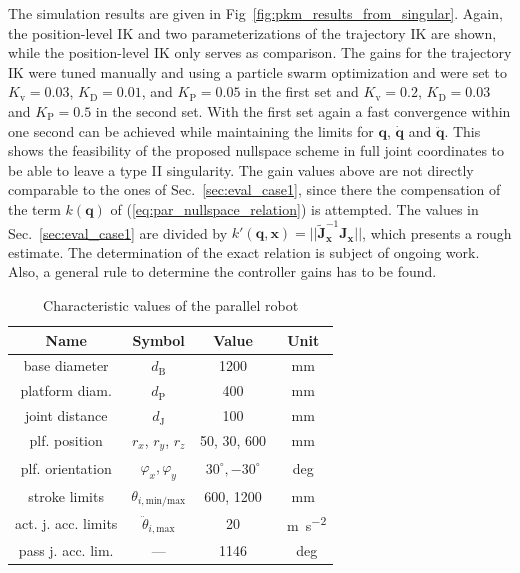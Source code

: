 \documentclass[a4paper,twoside]{article}
\begin{document}
The simulation results are given in Fig~\ref{fig:pkm_results_from_singular}.
Again, the position-level IK and two parameterizations of the trajectory IK are shown, while the position-level IK only serves as comparison.
The gains for the trajectory IK were tuned manually and using a particle swarm optimization and were set to $K_\mathrm{v}{=}0.03$, $K_\mathrm{D}{=}0.01$, and $K_\mathrm{P}{=}0.05$ in the first set and $K_\mathrm{v}{=}0.2$, $K_\mathrm{D}{=}0.03$ and $K_\mathrm{P}{=}0.5$ in the second set.
With the first set again a fast convergence within one second can be achieved while maintaining the limits for $\bm{q}$, $\dot{\bm{q}}$ and $\ddot{\bm{q}}$.
This shows the feasibility of the proposed nullspace scheme in full joint coordinates to be able to leave a type II singularity.
%
The gain values above are not directly comparable to the ones of Sec.~\ref{sec:eval_case1}, since there the compensation of the term $k(\bm{q})$ of (\ref{eq:par_nullspace_relation}) is attempted.
The values in Sec.~\ref{sec:eval_case1} are divided by $k'(\bm{q},\bm{x})=||\tilde{\bm{J}}^{-1}_{\bm{x}} \bm{J}_{\bm{x}}||$, which presents a rough estimate.
The determination of the exact relation is subject of ongoing work.
Also, a general rule to determine the controller gains has to be found.




%


\begin{table}[b] %
	\caption{Characteristic values of the parallel robot}
	\label{tab:hexapod_values}
	\centering
	\setlength\tabcolsep{3 pt}
	\begin{tabular}[t]{|c|c|c|c|}
		\hline
		\textbf{Name} & \textbf{Symbol} & \textbf{Value} & \textbf{Unit} \\
		\hline
		base diameter & $d_\mathrm{B}$ & 1200 &mm \\
		platform diam. & $d_\mathrm{P}$ & 400 & mm \\
		joint distance & $d_\mathrm{J}$ & 100 & mm \\
		plf. position & $r_x$, $r_y$, $r_z$ & 50, 30, 600 & mm \\
		plf. orientation & $\varphi_x, \varphi_y$ & $30^\circ,{-}30^\circ$ & deg \\
		stroke limits & $\theta_{i,\mathrm{min/max}}$ & 600, 1200 & mm\\ %
		act. j. acc. limits & $\ddot{\theta}_{i,\mathrm{max}}$ & 20 & \SI{}{\metre\per\square\second} \\
		pass j. acc. lim. & --- & 1146 & \SI{}{deg\per\second\square}\\
		\hline
	\end{tabular}
\end{table}
\end{document}
